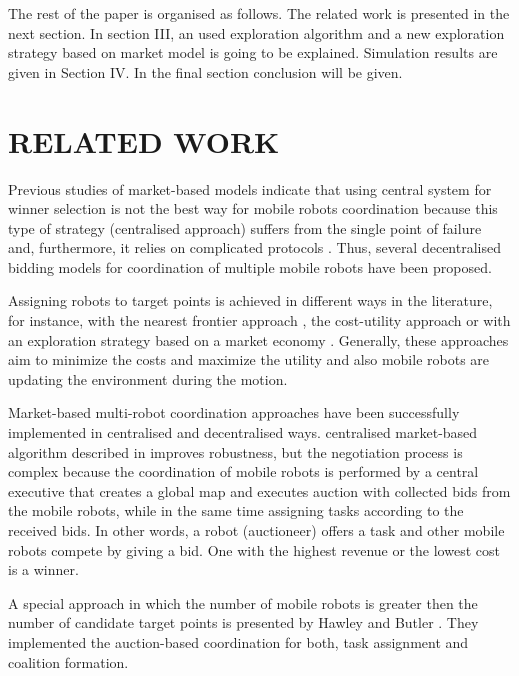 \documentclass[letterpaper, 10 pt, conference]{ieeeconf}  %
\begin{document}
The rest of the paper is organised as follows. The related work is presented in the next section. In section III, an used exploration algorithm and a new exploration strategy based on market model is going to be explained. Simulation results are given in Section IV. In the final section conclusion will be given.



\section{RELATED WORK}


Previous studies of market-based models indicate that using central system for winner selection is not the best way for mobile robots coordination because this type of strategy (centralised approach) suffers from the single point of failure and, furthermore, it relies on complicated protocols \cite{Sheng}. Thus, several decentralised bidding models for coordination of multiple mobile robots have been proposed. 

Assigning robots to target points is achieved in different ways in the literature, for instance, with the nearest frontier approach \cite{Yamauchi}, the cost-utility approach \cite{burgard} or  with an exploration strategy based on a market economy \cite{market-economy}. Generally, these approaches aim to minimize the costs and maximize the utility and also mobile robots are updating the environment during the motion.  

Market-based multi-robot coordination approaches have been successfully implemented in centralised and decentralised ways.
centralised market-based algorithm described in \cite{burgard} improves robustness, but the negotiation process is complex because the coordination of mobile robots is performed by a central executive that creates a global map and executes auction with collected bids from the mobile robots, while in the same time assigning tasks according to the received bids. In other words, a robot (auctioneer) offers a task and other mobile robots compete by giving a bid. One with the highest revenue or the lowest cost is a winner. 

A special approach in which the number of mobile robots is greater then the number of candidate target points is presented by Hawley and Butler \cite{Hawley}. They implemented the auction-based coordination for both, task assignment and coalition formation. 
 
\end{document}

